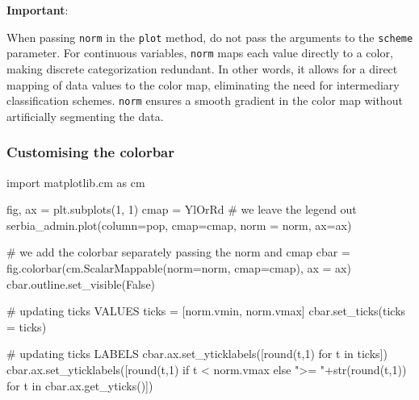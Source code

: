 \documentclass[
  letterpaper,
  DIV=11,
  numbers=noendperiod]{scrreprt}
\newenvironment{Shaded}{\begin{snugshade}}{\end{snugshade}}
\newcommand{\BuiltInTok}[1]{\textcolor[rgb]{0.00,0.23,0.31}{#1}}
\newcommand{\CommentTok}[1]{\textcolor[rgb]{0.37,0.37,0.37}{#1}}
\newcommand{\ControlFlowTok}[1]{\textcolor[rgb]{0.00,0.23,0.31}{#1}}
\newcommand{\DecValTok}[1]{\textcolor[rgb]{0.68,0.00,0.00}{#1}}
\newcommand{\ImportTok}[1]{\textcolor[rgb]{0.00,0.46,0.62}{#1}}
\newcommand{\KeywordTok}[1]{\textcolor[rgb]{0.00,0.23,0.31}{#1}}
\newcommand{\NormalTok}[1]{\textcolor[rgb]{0.00,0.23,0.31}{#1}}
\newcommand{\OperatorTok}[1]{\textcolor[rgb]{0.37,0.37,0.37}{#1}}
\newcommand{\StringTok}[1]{\textcolor[rgb]{0.13,0.47,0.30}{#1}}
\newcommand{\VariableTok}[1]{\textcolor[rgb]{0.07,0.07,0.07}{#1}}
\begin{document}
\textbf{Important}:

When passing \texttt{norm} in the \texttt{plot} method, do not pass the
arguments to the \texttt{scheme} parameter. For continuous variables,
\texttt{norm} maps each value directly to a color, making discrete
categorization redundant. In other words, it allows for a direct mapping
of data values to the color map, eliminating the need for intermediary
classification schemes. \texttt{norm} ensures a smooth gradient in the
color map without artificially segmenting the data.

\subsubsection{Customising the colorbar}\label{customising-the-colorbar}

\begin{Shaded}
\begin{Highlighting}[]
\ImportTok{import}\NormalTok{ matplotlib.cm }\ImportTok{as}\NormalTok{ cm}

\NormalTok{fig, ax }\OperatorTok{=}\NormalTok{ plt.subplots(}\DecValTok{1}\NormalTok{, }\DecValTok{1}\NormalTok{)}
\NormalTok{cmap }\OperatorTok{=} \StringTok{\textquotesingle{}YlOrRd\textquotesingle{}}
\CommentTok{\# we leave the legend out}
\NormalTok{serbia\_admin.plot(column}\OperatorTok{=}\StringTok{\textquotesingle{}pop\textquotesingle{}}\NormalTok{, cmap}\OperatorTok{=}\NormalTok{cmap, norm }\OperatorTok{=}\NormalTok{ norm, ax}\OperatorTok{=}\NormalTok{ax)}

\CommentTok{\# we add the colorbar separately passing the norm and cmap}
\NormalTok{cbar }\OperatorTok{=}\NormalTok{ fig.colorbar(cm.ScalarMappable(norm}\OperatorTok{=}\NormalTok{norm, cmap}\OperatorTok{=}\NormalTok{cmap), ax }\OperatorTok{=}\NormalTok{ ax)}
\NormalTok{cbar.outline.set\_visible(}\VariableTok{False}\NormalTok{)}

\CommentTok{\# updating ticks VALUES}
\NormalTok{ticks }\OperatorTok{=}\NormalTok{ [norm.vmin, norm.vmax]}
\NormalTok{cbar.set\_ticks(ticks }\OperatorTok{=}\NormalTok{ ticks)}

\CommentTok{\# updating ticks LABELS}
\NormalTok{cbar.ax.set\_yticklabels([}\BuiltInTok{round}\NormalTok{(t,}\DecValTok{1}\NormalTok{) }\ControlFlowTok{for}\NormalTok{ t }\KeywordTok{in}\NormalTok{ ticks])}
\NormalTok{cbar.ax.set\_yticklabels([}\BuiltInTok{round}\NormalTok{(t,}\DecValTok{1}\NormalTok{) }\ControlFlowTok{if}\NormalTok{ t }\OperatorTok{\textless{}}\NormalTok{ norm.vmax }\ControlFlowTok{else} \StringTok{"\textgreater{}= "}\OperatorTok{+}\BuiltInTok{str}\NormalTok{(}\BuiltInTok{round}\NormalTok{(t,}\DecValTok{1}\NormalTok{)) }\ControlFlowTok{for}\NormalTok{ t }\KeywordTok{in}\NormalTok{ cbar.ax.get\_yticks()])}
\end{Highlighting}
\end{Shaded}
\end{document}
